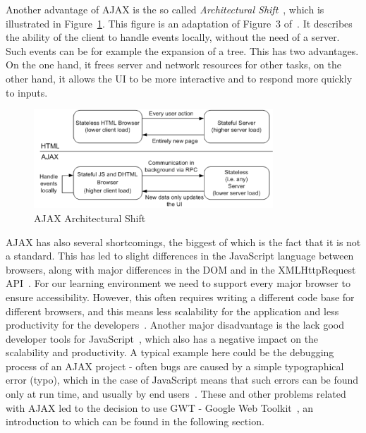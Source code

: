 Another advantage of AJAX is the so called \textit{Architectural Shift}~\cite{wgdd1}, 
which is illustrated in Figure~\ref{fig:ajax02}. This figure 
is an adaptation of Figure~3 of~\cite{wgdd1}. 
It describes the ability of the client to handle events
locally, without the need of a server. Such events can be for example the
expansion of a tree. This has two advantages. On the one hand, it frees server 
and network resources for other tasks, on the other hand, it allows
the UI to be more interactive and to respond more quickly to inputs.

\begin{figure}[h]
	\begin{center}
		\includegraphics[width=0.8\textwidth]{./img/ajax02a.png}
		\caption{AJAX Architectural Shift}
		\label{fig:ajax02}
	\end{center}
\end{figure}

AJAX has also several shortcomings,
the biggest of which is the fact that it is not a standard. This has led to slight 
differences in the JavaScript language between browsers, along with major differences 
in the DOM and in the XMLHttpRequest API~\cite{bgwt1, bgwt2, bgwt3}. 
For our learning environment we need to support every major browser to ensure accessibility. 
However, this often requires writing a different code base for different browsers,
and this means less scalability for the application and less productivity 
for the developers~\cite{bgwt2}. Another major
disadvantage is the lack good developer tools for JavaScript~\cite{bgwt2}, which also 
has a negative impact on the scalability and productivity.
A typical example here could be the debugging process of an AJAX project - 
often bugs are caused by a simple typographical error (typo), which in the case 
of JavaScript means that such errors can be found only at run time, and usually 
by end users~\cite{wgdd1}. 
These and other problems related with AJAX
led to the decision to use GWT - Google Web Toolkit~\cite{wgwt}, an introduction 
to which can be found in the following section.

